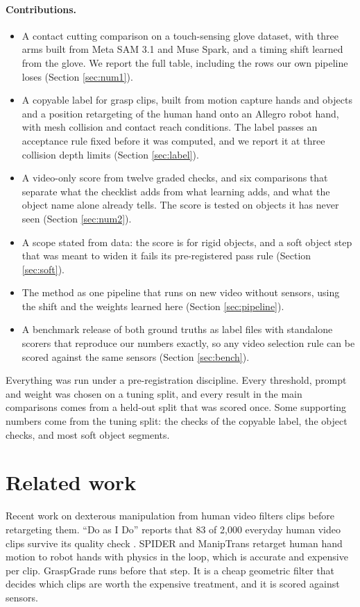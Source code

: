 \documentclass[10pt,twocolumn,letterpaper]{article}
\begin{document}
\paragraph{Contributions.}
\begin{itemize}
\item A contact cutting comparison on a touch-sensing glove dataset, with
three arms built from Meta SAM 3.1 and Muse Spark, and a timing shift learned
from the glove. We report the full table, including the rows our own pipeline
loses (Section \ref{sec:num1}).
\item A copyable label for grasp clips, built from motion capture hands and
objects and a position retargeting of the human hand onto an Allegro robot
hand, with mesh collision and contact reach conditions. The label passes an
acceptance rule fixed before it was computed, and we report it at three
collision depth limits (Section \ref{sec:label}).
\item A video-only score from twelve graded checks, and six comparisons that
separate what the checklist adds from what learning adds, and what the object
name alone already tells. The score is tested on objects it has never seen
(Section \ref{sec:num2}).
\item A scope stated from data: the score is for rigid objects, and a soft
object step that was meant to widen it fails its pre-registered pass rule
(Section \ref{sec:soft}).
\item The method as one pipeline that runs on new video without sensors, using
the shift and the weights learned here (Section \ref{sec:pipeline}).
\item A benchmark release of both ground truths as label files with standalone
scorers that reproduce our numbers exactly, so any video selection rule can be
scored against the same sensors (Section \ref{sec:bench}).
\end{itemize}

Everything was run under a pre-registration discipline. Every threshold,
prompt and weight was chosen on a tuning split, and every result in the main
comparisons comes from a held-out split that was scored once. Some supporting
numbers come from the tuning split: the checks of the copyable label, the
object checks, and most soft object segments.

\section{Related work}

Recent work on dexterous manipulation from human video filters clips before
retargeting them. ``Do as I Do'' reports that 83 of 2,000 everyday human video
clips survive its quality check \cite{doasido}. SPIDER \cite{spider} and
ManipTrans \cite{maniptrans} retarget human hand motion to robot hands with
physics in the loop, which is accurate and expensive per clip. GraspGrade runs
before that step. It is a cheap geometric filter that decides which clips are
worth the expensive treatment, and it is scored against sensors.
\end{document}
